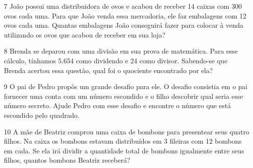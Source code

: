 
\num{7} João possui uma distribuidora de ovos e acabou de receber 14 caixas
com 300 ovos cada uma. Para que João venda essa mercadoria, ele faz
embalagens com 12 ovos cada uma. Quantas embalagens João conseguirá
fazer para colocar à venda utilizando os ovos que acabou de receber em
sua loja?




\num{8} Brenda se deparou com uma divisão em sua prova de matemática. Para
esse cálculo, tínhamos 5.654 como dividendo e 24 como divisor. Sabendo-se
que Brenda acertou essa questão, qual foi o quociente encontrado por ela?



\num{9} O pai de Pedro propôs um grande desafio para ele. O desafio
consistia em o pai fornecer uma conta com um número escondido e o filho descobrir qual seria esse número secreto. Ajude Pedro com esse
desafio e encontre o número que está escondido pelo quadrado.



\num{10} A mãe de Beatriz comprou uma caixa de bombons para presentear seus
quatro filhos. Na caixa os bombons estavam distribuídos em 3 fileiras
com 12 bombons em cada. Se ela irá dividir a quantidade total de bombons
igualmente entre seus filhos, quantos bombons Beatriz receberá?



